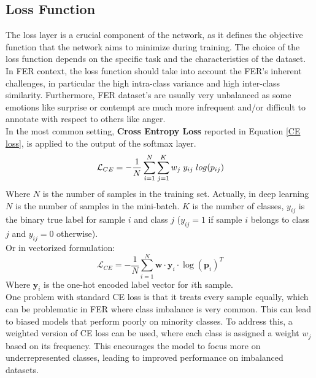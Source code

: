 \subsection{Loss Function}

The loss layer is a crucial component of the network, as it defines the objective function that the network aims to minimize during training. The choice of the loss function depends on the specific task and the characteristics of the dataset. In FER context, the loss function should take into account the FER's inherent challenges, in particular the high intra-class variance and high inter-class similarity. Furthermore, FER dataset's are usually very unbalanced as some emotions like surprise or contempt are much more infrequent and/or difficult to annotate with respect to others like anger. \\

In the most  common setting, \textbf{Cross Entropy Loss} reported in Equation \ref{CE loss}, is applied to the output of the softmax layer.
\begin{equation}\label{CE loss}
    \mathcal{L}_{CE} = -\frac{1}{N} \sum^{N}_{i=1}\sum^{K}_{j=1} w_j \thickspace y_{ij} \thickspace  log(p_{ij})
\end{equation}
Where $N$ is the number of samples in the training set. Actually, in deep learning $N$ is the number of samples in the mini-batch. $K$ is the number of classes, $y_{ij}$ is the binary true label for sample $i$ and class $j$ ($y_{ij}=1$ if sample $i$ belongs to class $j$ and $y_{ij}=0$ otherwise).\\
Or in vectorized formulation:
\begin{equation}
    \mathcal{L}_{CE} = -\frac{1}{N} \sum_{i=1}^{N} \bm{w} \cdot \bm{y}_i \cdot \log(\bm{p}_i)^T
\end{equation}
Where $\bm{y}_i$ is the one-hot encoded label vector for $i$th sample.\\

One problem with standard CE loss is that it treats every sample equally, which can be problematic in FER where class imbalance is very common. This can lead to biased models that perform poorly on minority classes. To address this, a weighted version of CE loss can be used, where each class is assigned a weight $w_j$ based on its frequency. This encourages the model to focus more on underrepresented classes, leading to improved performance on imbalanced datasets.\\

